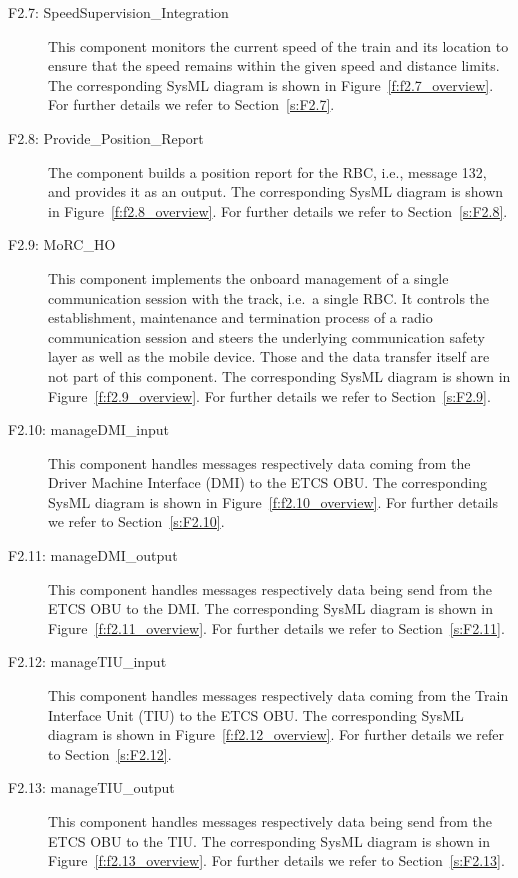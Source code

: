 \begin{description}
\item[F2.7: SpeedSupervision\_Integration] This component monitors the current speed of the train and its location to ensure that the speed remains within the given speed and distance limits. The corresponding SysML diagram is shown in Figure~\ref{f:f2.7_overview}. For further details we refer to Section~\ref{s:F2.7}.


\item[F2.8: Provide\_Position\_Report] The component builds a position report for the RBC, i.e., message 132, and provides it as an output. The corresponding SysML diagram is shown in Figure~\ref{f:f2.8_overview}. For further details we refer to Section~\ref{s:F2.8}.


\item[F2.9: MoRC\_HO] This component implements the onboard management of a single communication session with the track, i.e.~a single RBC. It controls the establishment, maintenance and termination process of a radio communication session and steers the underlying communication safety layer as well as the mobile device. Those and the data transfer itself are not part of this component. The corresponding SysML diagram is shown in Figure~\ref{f:f2.9_overview}. For further details we refer to Section~\ref{s:F2.9}.


\item[F2.10: manageDMI\_input] This component handles messages respectively data coming from the Driver Machine Interface (DMI) to the ETCS OBU. The corresponding SysML diagram is shown in Figure~\ref{f:f2.10_overview}. For further details we refer to Section~\ref{s:F2.10}.


\item[F2.11: manageDMI\_output] This component handles messages respectively data being send from the ETCS OBU to the DMI. The corresponding SysML diagram is shown in Figure~\ref{f:f2.11_overview}. For further details we refer to Section~\ref{s:F2.11}.


\item[F2.12: manageTIU\_input] This component handles messages respectively data coming from the Train Interface Unit (TIU) to the ETCS OBU. The corresponding SysML diagram is shown in Figure~\ref{f:f2.12_overview}. For further details we refer to Section~\ref{s:F2.12}.


\item[F2.13: manageTIU\_output] This component handles messages respectively data being send from the ETCS OBU to the TIU. The corresponding SysML diagram is shown in Figure~\ref{f:f2.13_overview}. For further details we refer to Section~\ref{s:F2.13}.
\end{description}

